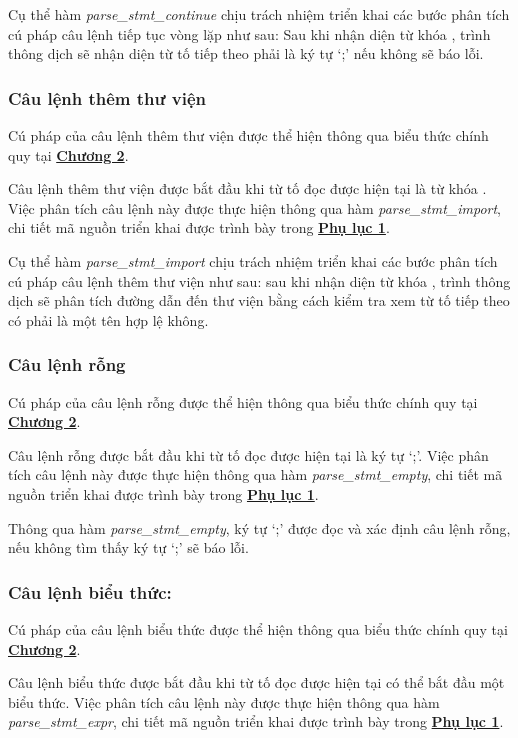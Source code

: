 Cụ thể hàm \textit{parse\_stmt\_continue} chịu trách nhiệm triển khai các bước phân tích cú pháp câu lệnh tiếp tục vòng lặp như sau:
Sau khi nhận diện từ khóa , trình thông dịch sẽ nhận diện từ tố tiếp theo phải là ký tự `;' nếu không sẽ báo lỗi.

\subsubsection{Câu lệnh thêm thư viện}

Cú pháp của câu lệnh thêm thư viện được thể hiện thông qua biểu thức chính quy tại \hyperref[ch2:import_stmt]{\bf Chương 2}.

Câu lệnh thêm thư viện được bắt đầu khi từ tố đọc được hiện tại là từ khóa . Việc phân tích câu lệnh này được thực hiện thông qua hàm \textit{parse\_stmt\_import}, chi tiết mã nguồn triển khai được trình bày trong \hyperref[ap1:stmt_add]{\bf Phụ lục 1}. %

Cụ thể hàm \textit{parse\_stmt\_import} chịu trách nhiệm triển khai các bước phân tích cú pháp câu lệnh thêm thư viện như sau: 
sau khi nhận diện từ khóa , trình thông dịch sẽ phân tích đường dẫn đến thư viện bằng cách kiểm tra xem từ tố tiếp theo có phải là một tên hợp lệ không.

\subsubsection{Câu lệnh rỗng}

Cú pháp của câu lệnh rỗng được thể hiện thông qua biểu thức chính quy tại \hyperref[ch2:empty_stmt]{\bf Chương 2}.

Câu lệnh rỗng được bắt đầu khi từ tố đọc được hiện tại là ký tự `;'. Việc phân tích câu lệnh này được thực hiện thông qua hàm \textit{parse\_stmt\_empty}, chi tiết mã nguồn triển khai được trình bày trong \hyperref[ap1:stmt_semicolon]{\bf Phụ lục 1}.

Thông qua hàm \textit{parse\_stmt\_empty}, ký tự `;' được đọc và xác định câu lệnh rỗng, nếu không tìm thấy ký tự `;' sẽ báo lỗi.

\subsubsection{Câu lệnh biểu thức:} 
Cú pháp của câu lệnh biểu thức được thể hiện thông qua biểu thức chính quy tại \hyperref[ch2:expr_stmt]{\bf Chương 2}.

Câu lệnh biểu thức được bắt đầu khi từ tố đọc được hiện tại có thể bắt đầu một biểu thức. Việc phân tích câu lệnh này được thực hiện thông qua hàm \textit{parse\_stmt\_expr}, chi tiết mã nguồn triển khai được trình bày trong \hyperref[ap1:stmt_expr]{\bf Phụ lục 1}. %

